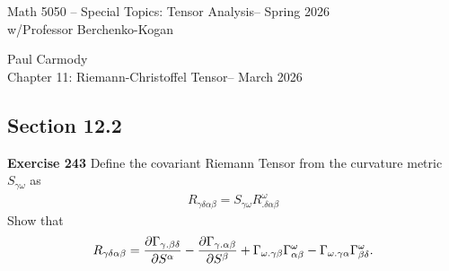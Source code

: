 \documentclass[12pt,a4paper]{report}
\newcommand{\CLASSNAME}{Math 5050 -- Special Topics: Tensor Analysis}
\newcommand{\STUDENTNAME}{Paul Carmody}
\newcommand{\ASSIGNMENT}{Chapter 11: Riemann-Christoffel Tensor}
\newcommand{\DUEDATE}{March 2026}
\newcommand{\PROFESSOR}{Professor Berchenko-Kogan}
\newcommand{\SEMESTER}{Spring 2026}
\begin{document}
\begin{center}
	\Large{\CLASSNAME -- \SEMESTER} \\
	\large{ w/\PROFESSOR}
\end{center}
\begin{center}
	\STUDENTNAME \\
	\ASSIGNMENT -- \DUEDATE\\
\end{center} 

\begin{description}

\section*{Section 12.2}
\item \textbf{Exercise 243} Define the covariant Riemann Tensor from the curvature metric $S_{\gamma\omega}$ as 
\begin{align*}
	R_{\gamma\delta\alpha\beta} = S_{\gamma\omega}R^\omega_{.\delta\alpha\beta}
\end{align*}Show that
\begin{align*}
	R_{\gamma\delta\alpha\beta} = \frac{\partial \Gamma_{\gamma.\beta\delta}}{\partial S^\alpha} - \frac{\partial \Gamma_{\gamma.\alpha\beta}}{\partial S^\beta} + \Gamma_{\omega.\gamma\beta}\Gamma^\omega_{\alpha\beta} -\Gamma_{\omega.\gamma\alpha}\Gamma^{\omega}_{\beta\delta}.
\end{align*}


\end{description}
\end{document}
